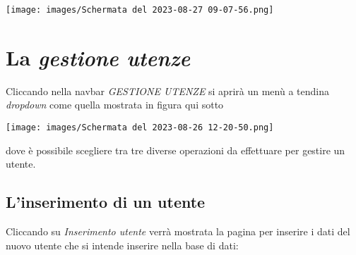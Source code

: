 \documentclass{article}
\begin{document}
    \texttt{[image: images/Schermata del 2023-08-27 09-07-56.png]}

    \pagebreak

    \section{La \textit{gestione utenze}}

    Cliccando nella navbar \textit{GESTIONE UTENZE} si aprirà un menù a tendina \textit{dropdown} come quella mostrata in figura qui sotto
    \begin{center}
        \texttt{[image: images/Schermata del 2023-08-26 12-20-50.png]}
    \end{center}
    dove è possibile scegliere tra tre diverse operazioni da effettuare per gestire un utente.
    \subsection{L'inserimento di un utente}
    Cliccando su \textit{Inserimento utente} verrà mostrata la pagina per inserire i dati del nuovo utente che si intende inserire nella base di dati:
\end{document}
